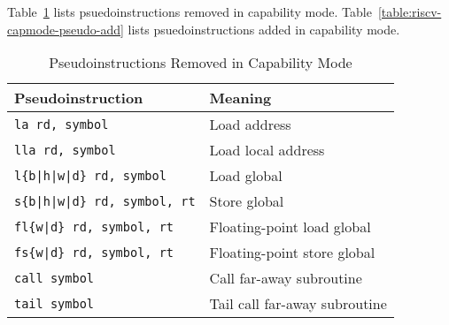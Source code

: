 {	Table~\ref{table:riscv-capmode-pseudo-remove} lists psuedoinstructions
	removed in capability mode.
	Table~\ref{table:riscv-capmode-pseudo-add} lists psuedoinstructions
	added in capability mode.

\begin{table}
\begin{center}
\begin{tabular}{ll}
\toprule
Pseudoinstruction	& Meaning \\
\midrule
\texttt{la rd, symbol} & Load address \\
\texttt{lla rd, symbol} & Load local address \\
\texttt{l\{b|h|w|d\} rd, symbol} & Load global \\
\texttt{s\{b|h|w|d\} rd, symbol, rt} & Store global \\
\texttt{fl\{w|d\} rd, symbol, rt} & Floating-point load global \\
\texttt{fs\{w|d\} rd, symbol, rt} & Floating-point store global \\
\midrule
\texttt{call symbol} & Call far-away subroutine \\
\texttt{tail symbol} & Tail call far-away subroutine \\
\bottomrule
\end{tabular}
\end{center}
\caption{Pseudoinstructions Removed in Capability Mode}
\label{table:riscv-capmode-pseudo-remove}
\end{table}

}
